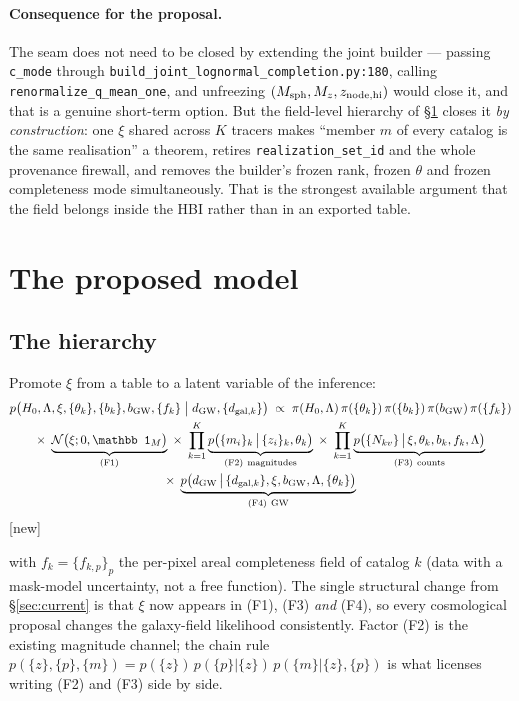 \paragraph{Consequence for the proposal.}  The seam does not need to be closed
by extending the joint builder --- passing \verb|c_mode| through
\texttt{build\_joint\_lognormal\_completion.py:180}, calling
\verb|renormalize_q_mean_one|, and unfreezing $(M_{\rm sph},M_z,z_{\rm node,hi})$
would close it, and that is a genuine short-term option.  But the field-level
hierarchy of \S\ref{sec:proposed} closes it \emph{by construction}: one $\xi$
shared across $K$ tracers makes ``member $m$ of every catalog is the same
realisation'' a theorem, retires \verb|realization_set_id| and the whole
provenance firewall, and removes the builder's frozen rank, frozen $\theta$ and
frozen completeness mode simultaneously.  That is the strongest available
argument that the field belongs inside the HBI rather than in an exported
table.

\section{The proposed model}
\label{sec:proposed}

\subsection{The hierarchy}

Promote $\xi$ from a table to a latent variable of the inference:
\begin{multline}
  p\big(H_0,\Lambda,\xi,\{\theta_k\},\{b_k\},b_{\rm GW},\{f_k\}\;\big|\;
     d_{\rm GW},\{d_{{\rm gal},k}\}\big)
  \;\propto\;
  \pi(H_0,\Lambda)\,\pi(\{\theta_k\})\,\pi(\{b_k\})\,\pi(b_{\rm GW})\,\pi(\{f_k\})\\
  \times\;\underbrace{\mathcal N\big(\xi;0,\mathbb 1_M\big)}_{\rm (F1)}\;
  \times\;\prod_{k=1}^{K}\underbrace{p\big(\{m_i\}_k\,\big|\,\{z_i\}_k,\theta_k\big)}_{\rm (F2)\ magnitudes}\;
  \times\;\prod_{k=1}^{K}\underbrace{p\big(\{N_{kv}\}\,\big|\,\xi,\theta_k,b_k,f_k,\Lambda\big)}_{\rm (F3)\ counts}\\
  \times\;\underbrace{p\big(d_{\rm GW}\,\big|\,\{d_{{\rm gal},k}\},\xi,b_{\rm GW},\Lambda,\{\theta_k\}\big)}_{\rm (F4)\ GW}
  \label{eq:hierarchy}
\end{multline}
\hfill[new]

\noindent with $f_k=\{f_{k,p}\}_{p}$ the per-pixel areal completeness field of
catalog $k$ (data with a mask-model uncertainty, not a free function).  The
single structural change from \S\ref{sec:current} is that
$\xi$ now appears in (F1), (F3) \emph{and} (F4), so every cosmological proposal
changes the galaxy-field likelihood consistently.  Factor (F2) is the existing
magnitude channel; the chain rule
$p(\{z\},\{p\},\{m\})=p(\{z\})\,p(\{p\}|\{z\})\,p(\{m\}|\{z\},\{p\})$ is what
licenses writing (F2) and (F3) side by side.

